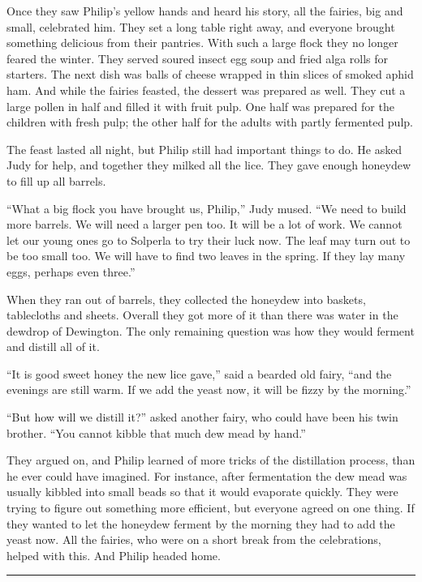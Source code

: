 \documentclass[10pt, draft]{memoir}
\renewcommand{\pfbreakdisplay}{\bigskip \ding{166} \bigskip}
\newcommand{\secbreak}{\fancybreak{\pfbreakdisplay}}
\begin{document}
Once they saw Philip's yellow hands and heard his story, all the fairies, big and small, celebrated him. They set a long table right away, and everyone brought something delicious from their pantries. With such a large flock they no longer feared the winter. They served soured insect egg soup and fried alga rolls for starters. The next dish was balls of cheese wrapped in thin slices of smoked aphid ham. And while the fairies feasted, the dessert was prepared as well. They cut a large pollen in half and filled it with fruit pulp. One half was prepared for the children with fresh pulp; the other half for the adults with partly fermented pulp.

The feast lasted all night, but Philip still had important things to do. He asked Judy for help, and together they milked all the lice. They gave enough honeydew to fill up all barrels.

``What a big flock you have brought us, Philip,'' Judy mused. ``We need to build more barrels. We will need a larger pen too. It will be a lot of work. We cannot let our young ones go to Solperla to try their luck now. The leaf may turn out to be too small too. We will have to find two leaves in the spring. If they lay many eggs, perhaps even three.''

When they ran out of barrels, they collected the honeydew into baskets, tablecloths and sheets. Overall they got more of it than there was water in the dewdrop of Dewington. The only remaining question was how they would ferment and distill all of it.

``It is good sweet honey the new lice gave,'' said a bearded old fairy, ``and the evenings are still warm. If we add the yeast now, it will be fizzy by the morning.''

``But how will we distill it?'' asked another fairy, who could have been his twin brother. ``You cannot kibble that much dew mead by hand.''

They argued on, and Philip learned of more tricks of the distillation process, than he ever could have imagined. For instance, after fermentation the dew mead was usually kibbled into small beads so that it would evaporate quickly. They were trying to figure out something more efficient, but everyone agreed on one thing. If they wanted to let the honeydew ferment by the morning they had to add the yeast now. All the fairies, who were on a short break from the celebrations, helped with this. And Philip headed home.

\secbreak
\end{document}
